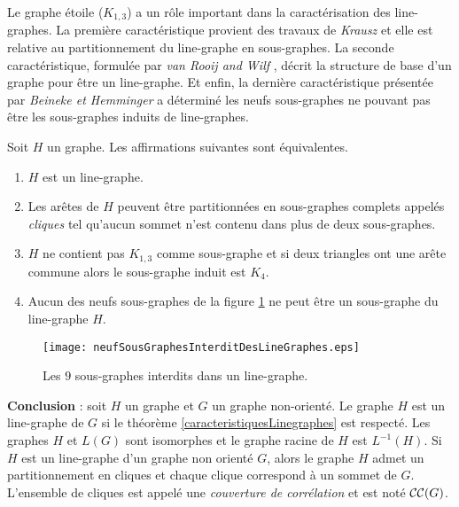 Le graphe \'etoile ($K_{1,3}$) a un r\^ole important dans la caract\'erisation des line-graphes.
La premi\`ere caract\'eristique provient des travaux de {\em Krausz} \cite{krausz1943demonstration} et elle est relative au partitionnement du line-graphe en sous-graphes. 
La seconde caract\'eristique, formul\'ee par {\em van Rooij and Wilf} \cite{ROOIJetWILF1965interchange}, d\'ecrit la structure de base d'un graphe pour \^etre un line-graphe. 
Et enfin, la derni\`ere caract\'eristique pr\'esent\'ee par {\em Beineke\cite{beineke1968derived} et Hemminger} a d\'etermin\'e les neufs sous-graphes ne pouvant pas \^etre les sous-graphes induits  de line-graphes. 
\begin{theorem}\cite{lineGraphe}
\label{caracteristiquesLinegraphes}
Soit $H$ un graphe. Les affirmations suivantes sont \'equivalentes.
\begin{enumerate}[label = (\alph*)]
	\item $H$ est un line-graphe.
	\item Les ar\^etes de $H$ peuvent \^etre partitionn\'ees en sous-graphes complets appel\'es {\em cliques} tel qu'aucun sommet n'est contenu dans plus de deux sous-graphes. 
	\item $H$ ne contient pas $K_{1,3}$ comme sous-graphe et si deux triangles ont une ar\^ete commune alors le sous-graphe induit est $K_4$.
	\item Aucun des neufs sous-graphes de la figure \ref{neufSousGraphesInterditDesLineGraphes} ne peut \^etre un sous-graphe du line-graphe $H$.
\end{enumerate}
\end{theorem}

\begin{figure}[htb!]\vspace{-0.5em}
	\centering
	\texttt{[image: neufSousGraphesInterditDesLineGraphes.eps]}\vspace{-0.5em}
	\caption{ Les $9$ sous-graphes interdits dans un line-graphe. }\vspace{-0.5em}
	\label{neufSousGraphesInterditDesLineGraphes}
\end{figure}
\FloatBarrier

{\bf Conclusion} :
soit $H$ un graphe et $G$ un graphe non-orient\'e.
Le graphe $H$ est un line-graphe de $G$ si le th\'eor\`eme \ref{caracteristiquesLinegraphes} est respect\'e.
Les graphes $H$ et $L(G)$ sont isomorphes et le graphe racine de $H$ est $L^{-1}(H)$.
Si $H$ est un line-graphe d'un graphe non orient\'e $G$,
alors le graphe $H$ admet un partitionnement en cliques et chaque clique correspond \`a un sommet de $G$. L'ensemble de cliques est appel\'e une {\em couverture de corr\'elation} et est not\'e ${\cal CC}(G)$.